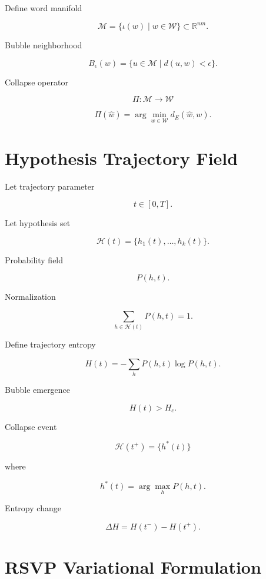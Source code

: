 \documentclass[11pt]{article}
\begin{document}
Define word manifold

\[
\mathcal{M}
=
\{ \iota(w) \mid w \in \mathcal{W} \}
\subset \mathbb{R}^{nm}.
\]

Bubble neighborhood

\[
B_\epsilon(w)
=
\{u \in \mathcal{M} \mid d(u,w) < \epsilon\}.
\]

Collapse operator

\[
\Pi :
\mathcal{M}
\rightarrow
\mathcal{W}
\]

\[
\Pi(\hat{w})
=
\arg\min_{w\in\mathcal{W}} d_E(\hat{w},w).
\]


\section{Hypothesis Trajectory Field}

Let trajectory parameter

\[
t \in [0,T].
\]

Let hypothesis set

\[
\mathcal{H}(t)
=
\{h_1(t),\dots,h_k(t)\}.
\]

Probability field

\[
P(h,t).
\]

Normalization

\[
\sum_{h \in \mathcal{H}(t)} P(h,t) = 1.
\]

Define trajectory entropy

\[
H(t)
=
-\sum_h P(h,t)\log P(h,t).
\]

Bubble emergence

\[
H(t) > H_c.
\]

Collapse event

\[
\mathcal{H}(t^+)
=
\{h^*(t)\}
\]

where

\[
h^*(t) = \arg\max_h P(h,t).
\]

Entropy change

\[
\Delta H
=
H(t^-) - H(t^+).
\]


\section{RSVP Variational Formulation}
\end{document}
